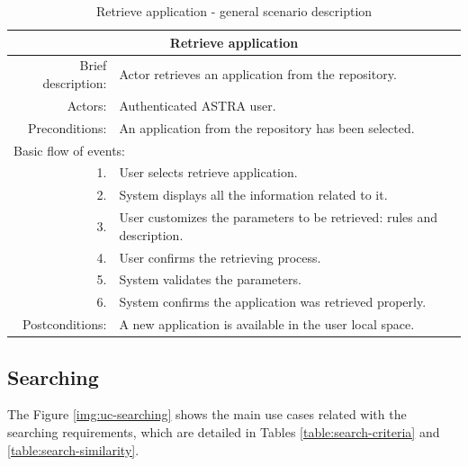 \begin{table}[h!]
	\small
    \begin{center}
		\begin{tabular}{||r|l||}
		\hline \hline
		\multicolumn{2}{||c||}{\bfseries{Retrieve application}} \\
		\hline
		\hline 
		Brief description: & Actor retrieves an application from the repository. \\
		\hline
		Actors: & Authenticated ASTRA user. \\
		\hline
		Preconditions: &  An application from the repository has been selected. \\
		\hline \hline
		\multicolumn{2}{||l||}{Basic flow of events:} \\
		\hline \hline
			1. & User selects retrieve application. \\
			2. & System displays all the information related to it. \\
			3. & User customizes the parameters to be retrieved: rules and description.	\\ 
			4. & User confirms the retrieving process. \\ 
			5. & System validates the parameters. \\
			6. & System confirms the application was retrieved properly. \\\hline \hline
		Postconditions: &  A new application is available in the user local space. \\
		\hline \hline
		\end{tabular}
		\caption{\label{table:retrieve-app} Retrieve application - general scenario
		description}
	\end{center}
\end{table}


\clearpage

\subsection{Searching}
\label{subsec:searching-use-cases}
The Figure \ref{img:uc-searching} shows the main use cases related with the
searching requirements, which are detailed in Tables
\ref{table:search-criteria} and \ref{table:search-similarity}.

